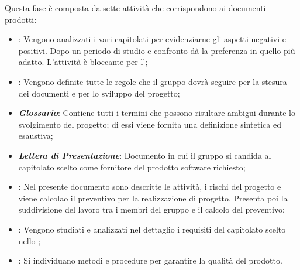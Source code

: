 Questa fase è composta da sette attività che corrispondono ai documenti prodotti:
\begin{itemize}
    \item \textbf{\textit{\SdF}}: Vengono analizzati i vari capitolati per evidenziarne gli aspetti
negativi e positivi. Dopo un periodo di studio e confronto {\Gruppo} dà la preferenza in quello più adatto. L'attività è bloccante per l'\textit{\AdR};

    \item \textbf{\textit{\NdP}}: Vengono definite tutte le regole che il gruppo {\Gruppo} dovrà seguire per la stesura dei documenti e per lo sviluppo del progetto;

    \item \textbf{\textit{Glossario}}: Contiene tutti i termini che possono risultare ambigui durante lo svolgimento del progetto; di essi viene fornita una definizione sintetica ed esaustiva;

    \item \textbf{\textit{Lettera di Presentazione}}: Documento in cui il gruppo {\Gruppo} si candida al capitolato scelto come fornitore del prodotto software richiesto;

    \item \textbf{\textit{\PdP}}: Nel presente documento sono descritte le attività, i rischi del progetto e viene calcolao il preventivo per la realizzazione di progetto. Presenta poi la suddivisione del lavoro tra i membri del gruppo {\Gruppo} e il calcolo del preventivo;

    \item \textbf{\textit{\AdR}}: Vengono studiati e analizzati nel dettaglio i requisiti del capitolato scelto nello \textit{\SdF};

    \item \textbf{\textit{\PdQ}}: Si individuano metodi e procedure per garantire la qualità del prodotto.
\end{itemize}

